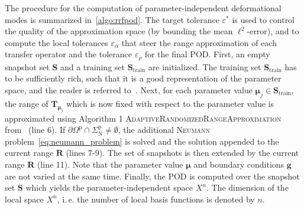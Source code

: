 \documentclass[a4paper]{eccomas_paper-2024}
\makeatletter
\newcommand{\ie}{i.\,e.\@\xspace}
\newcommand{\m}{\bm\mu}
\newcommand{\p}{\mathrm{p}}
\makeatother
\begin{document}
The procedure for the computation of parameter-independent deformational modes is summarized in~\cref{algo:rrfpod}.
The target tolerance $\varepsilon^{\ast}$ is used to control the quality of the approximation space (by bounding the mean $\ell^2$-error), and to compute the local tolerances $\varepsilon_{\alpha}$ that steer the range approximation of each transfer operator and the tolerance $\varepsilon_{\rho}$ for the final POD.
First, an empty snapshot set $\bm{S}$ and a training set $\bm{S}_{\mathrm{train}}$ are initialized.
The training set $\bm{S}_{\mathrm{train}}$ has to be sufficiently rich, such that it is a good representation of the parameter space, and the reader is referred to~\cite{Haasdonk2017Chapter}.
Next, for each parameter value $\m_j\in\bm{S}_{\mathrm{train}}$, the range of $\bm{T}_{\m_j}$ which is now fixed with respect to the parameter value is approximated using Algorithm 1 \textsc{AdaptiveRandomizedRangeApproximation} from~\cite{Buhr2018Randomized} (line 6).
If $\partial\varOmega^{\p}\cap\varSigma^{\p}_{\mathrm{N}}\ne\emptyset$, the additional \textsc{Neumann} problem~\cref{eq:neumann_problem} is solved and the solution appended to the current range $\bm{R}$ (lines 7-9).
The set of snapshots is then extended by the current range $\bm{R}$ (line 11).
Note that the parameter value $\m$ and boundary conditions $\bm{g}$ are not varied at the same time.
Finally, the POD is computed over the snapshot set $\bm{S}$ which yields the parameter-independent space $X^n$.
The dimension of the local space $X^n$, \ie{} the number of local basis functions is denoted by $n$.
\end{document}
